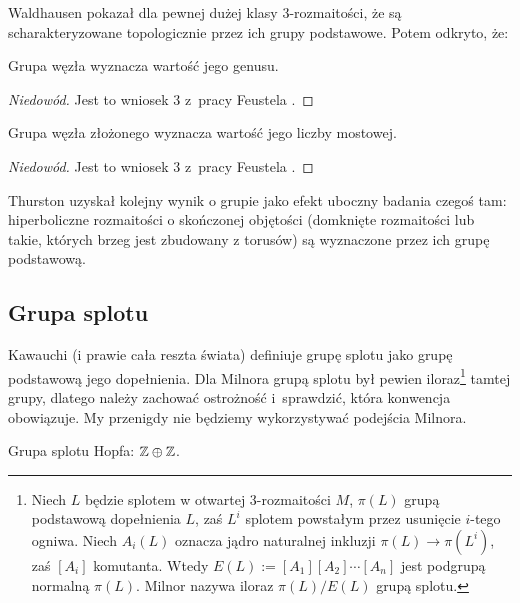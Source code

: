 Waldhausen \cite{waldhausen1968} pokazał dla pewnej dużej klasy 3-rozmaitości, że są scharakteryzowane topologicznie przez ich grupy podstawowe.
%
Potem odkryto, że:

\begin{proposition}
    Grupa węzła wyznacza wartość jego genusu.
\end{proposition}
\begin{proof}[Niedowód]
    Jest to wniosek 3 z~pracy Feustela \cite{feustel1978}.
\end{proof}
\begin{proposition}
    Grupa węzła złożonego wyznacza wartość jego liczby mostowej.
\end{proposition}
\begin{proof}[Niedowód]
    Jest to wniosek 3 z~pracy Feustela \cite{feustel1978}.
\end{proof}

Thurston \cite{thurston1982} uzyskał kolejny wynik o grupie jako efekt uboczny badania czegoś tam: hiperboliczne rozmaitości o skończonej objętości (domknięte rozmaitości lub takie, których brzeg jest zbudowany z torusów) są wyznaczone przez ich grupę podstawową.
%

\subsection{Grupa splotu}

Kawauchi \cite[s. 73]{kawauchi1996} (i prawie cała reszta świata) definiuje grupę splotu jako grupę podstawową jego dopełnienia.
Dla Milnora \cite{milnor1954} grupą splotu był pewien iloraz\footnote{%
Niech $L$ będzie splotem w otwartej 3-rozmaitości $M$, $\pi(L)$ grupą podstawową dopełnienia $L$, zaś $L^i$ splotem powstałym przez usunięcie $i$-tego ogniwa.
Niech $A_i(L)$ oznacza jądro naturalnej inkluzji $\pi(L) \to \pi(L^i)$, zaś $[A_i]$ komutanta.
Wtedy $E(L) := [A_1][A_2] \cdots [A_n]$ jest podgrupą normalną $\pi(L)$.
Milnor nazywa iloraz $\pi(L) / E(L)$ grupą splotu.%
} tamtej grupy, dlatego należy zachować ostrożność i~sprawdzić, która konwencja obowiązuje.
My przenigdy nie będziemy wykorzystywać podejścia Milnora.

\begin{example}
    Grupa splotu Hopfa: $\mathbb Z \oplus \mathbb Z$.
\end{example}

